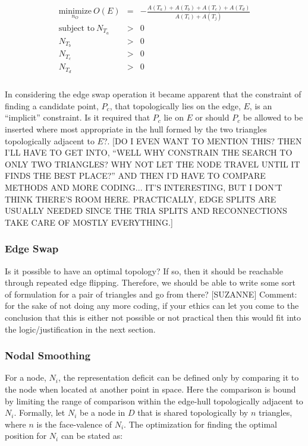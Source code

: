 \begin{eqnarray*}
\begin{array}{rcl}
\underset{n_O}{\text{minimize}} \ O(E) & = & - \frac{ A\left(T_a\right) + A\left(T_b\right) + A\left(T_c\right) + A\left(T_d\right) }{ A\left(T_i\right) + A\left(T_j\right) } \\
\text{subject to} \ N_{T_a} & > & 0 \\
N_{T_b} & > & 0 \\ 
N_{T_c} & > & 0 \\
N_{T_d} & > & 0 \\
\end{array}
\end{eqnarray*}

In considering the edge swap operation it became apparent that the constraint of finding a candidate point, $P_c$, that topologically lies on the edge, $E$, is an ``implicit'' constraint. Is it required that $P_c$ lie on $E$ or should $P_c$ be allowed to be inserted where most appropriate in the hull formed by the two triangles topologically adjacent to $E$?. [DO I EVEN WANT TO MENTION THIS? THEN I'LL HAVE TO GET INTO, ``WELL WHY CONSTRAIN THE SEARCH TO ONLY TWO TRIANGLES? WHY NOT LET THE NODE TRAVEL UNTIL IT FINDS THE BEST PLACE?'' AND THEN I'D HAVE TO COMPARE METHODS AND MORE CODING... IT'S INTERESTING, BUT I DON'T THINK THERE'S ROOM HERE. PRACTICALLY, EDGE SPLITS ARE USUALLY NEEDED SINCE THE TRIA SPLITS AND RECONNECTIONS TAKE CARE OF MOSTLY EVERYTHING.]

\subsubsection{Edge Swap}
Is it possible to have an optimal topology? If so, then it should be
reachable through repeated edge flipping. Therefore, we should be able
to write some sort of formulation for a pair of triangles and go from
there? [SUZANNE] Comment: for the sake of not doing any more coding, if
your ethics can let you come to the conclusion that this is either not
possible or not practical then this would fit into the
logic/justification in the next section.

\subsubsection{Nodal Smoothing}
For a node, $N_i$, the representation deficit can be defined only by
comparing it to the node when located at another point in space. Here
the comparison is bound by limiting the range of comparison within the
edge-hull topologically adjacent to $N_i$. Formally, let $N_i$ be a node
in $D$ that is shared topologically by $n$ triangles, where $n$ is the
face-valence of $N_i$. The optimization for finding the optimal position
for $N_i$ can be stated as:

